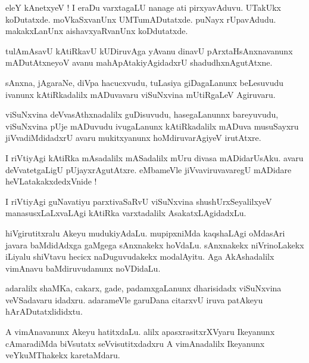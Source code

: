 \documentclass{article}
\begin{document}
\begin{mn}%
eleY kAnetxyeV ! I eraDu varxtagaLU nanage ati pirxyavAduvu. UTakUkx koDutatxde. moVkaSxvanUnx 
UMTumADutatxde. puNayx rUpavAdudu. makakxLanUnx aishavxyaRvanUnx koDdutatxde.
\end{mn}

\begin{mn}%
tulAmAsavU kAtiRkavU kUDiruvAga yAvanu dinavU pArxtaHsAnxnavanunx mADutAtxneyoV avanu 
mahApAtakiyAgidadxrU  shadudhxnAgutAtxne.
\end{mn}

\begin{mn}%
sAnxna, jAgaraNe, diVpa hacucxvudu, tuLasiya giDagaLanunx beLesuvudu ivanunx kAtiRkadalilx 
mADuvavaru viSuNxvina mUtiRgaLeV Agiruvaru.
\end{mn}

\begin{mn}%
viSuNxvina deVvasAthxnadalilx guDisuvudu, hasegaLanunnx bareyuvudu, viSuNxvina pUje mADuvudu 
ivugaLanunx kAtiRkadalilx mADuva musuSayxru jiVvadiMdidadxrU avaru mukitxyanunx hoMdiruvarAgiyeV 
irutAtxre.
\end{mn}

\begin{mn}%
I riVtiyAgi kAtiRka mAsadalilx mASadalilx mUru divasa mADidarUsAku. avaru deVvatetgaLigU 
pUjayxrAgutAtxre. eMbameVle jiVvaviruvavaregU mADidare heVLatakakxdedxVnide !
\end{mn}

\begin{mn}%
I riVtiyAgi guNavatiyu parxtivaSaRvU viSuNxvina shushUrxSeyalilxyeV manasusxLaLxvaLAgi kAtiRka 
varxtadalilx AsakatxLAgidadxLu.
\end{mn}

\begin{mn}%
hiVgirutitxralu Akeyu mudukiyAdaLu. mupipxniMda kaqshaLAgi oMdasAri javara baMdidAdxga gaMgega 
sAnxnakekx hoVdaLu. sAnxnakekx niVrinoLakekx iLiyalu shiVtavu hecicx naDuguvudakekx modalAyitu. 
Aga AkAshadalilx vimAnavu baMdiruvudanunx noVDidaLu.
\end{mn}

\begin{mn}%
adaralilx shaMKa, cakarx, gade, padamxgaLanunx dharisidadx viSuNxvina veVSadavaru idadxru. 
adarameVle garuDana citarxvU iruva patAkeyu hArADutatxlididxtu.
\end{mn}

\begin{mn}%
A vimAnavanunx Akeyu hatitxdaLu. alilx apasxrasitxrXVyaru Ikeyanunx cAmaradiMda biVsutatx 
seVvisutitxdadxru A vimAnadalilx Ikeyanunx veYkuMThakekx karetaMdaru.
\end{mn}
\end{document}
